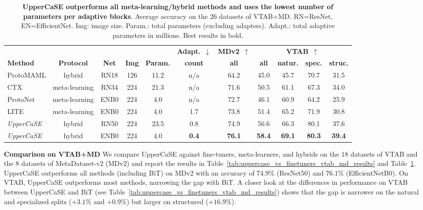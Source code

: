 \documentclass{article}
\begin{document}
\begin{table}[!h]
\caption{\textbf{UpperCaSE outperforms all meta-learning/hybrid methods and uses the lowest number of parameters per adaptive blocks}. Average accuracy on the 26 datasets of VTAB+MD. RN=ResNet, EN=EfficientNet. Img: image size. Param.: total parameters (excluding adapters). Adapt.: total adaptive parameters in millions.
Best results in bold.}
\vskip 0.1in
\begin{adjustbox}{width=1.0\textwidth,center}
\begin{tabular}{lcccccccccc}
\toprule
 & & & & & \multicolumn{1}{c}{\textbf{Adapt.}~$\downarrow$} & \multicolumn{1}{c}{\textbf{MDv2}~$\uparrow$} & \multicolumn{4}{c}{\textbf{VTAB}~$\uparrow$} \\
 \cmidrule(lr){6-6} \cmidrule(lr){7-7} \cmidrule(lr){8-11}
 \textbf{Method} & \textbf{Protocol} & \textbf{Net} & \textbf{Img} & \textbf{Param.} & \textbf{count} & \textbf{all} & \textbf{all} & \textbf{natur.} & \textbf{spec.} & \textbf{struc.} \\
\midrule
ProtoMAML & hybrid & RN18 & 126 & 11.2 & n/a & 64.2 & 45.0 & 45.7 & 70.7 & 31.5 \\
CTX & meta-learning & RN34 & 224 & 21.3 & n/a & 71.6 & 50.5 & 61.1 & 67.3 & 34.0 \\
ProtoNet & meta-learning & ENB0 & 224 & 4.0 & n/a & 72.7 & 46.1 & 60.9 & 64.2 & 25.9 \\
LITE & meta-learning & ENB0 & 224 & 4.0 & 1.7 & 73.8 & 51.4 & 65.2 & 71.9 & 30.8 \\
\midrule
\emph{UpperCaSE} & hybrid & RN50 & 224 & 23.5 & 0.8 & 74.9 & 56.6 & 66.3 & 80.1 & 37.6 \\
\emph{UpperCaSE} & hybrid & ENB0 & 224 & 4.0 & \textbf{0.4} & \textbf{76.1} & \textbf{58.4} & \textbf{69.1} & \textbf{80.3} & \textbf{39.4} \\
\bottomrule
\end{tabular}
\end{adjustbox}
\label{tab:uppercase_vs_metalearners_vtab_md_results}
\end{table}

\textbf{Comparison on VTAB+MD} We compare UpperCaSE against fine-tuners, meta-learners, and hybrids on the 18 datasets of VTAB and the 8 datasets of MetaDataset-v2 (MDv2) and report the results in Table~\ref{tab:uppercase_vs_finetuners_vtab_md_results} and Table~\ref{tab:uppercase_vs_metalearners_vtab_md_results}. UpperCaSE outperforms all methods (including BiT) on MDv2 with an accuracy of $74.9\%$ (ResNet50) and $76.1\%$ (EfficientNetB0). On VTAB, UpperCaSE outperforms most methods, narrowing the gap with BiT. A closer look at the differences in performance on VTAB between UpperCaSE and BiT (see Table~\ref{tab:uppercase_vs_finetuners_vtab_md_results}) shows that the gap is narrower on the natural and specialized splits ($+3.1\%$ and $+0.9\%$) but larger on structured ($+16.9\%$).
\end{document}
